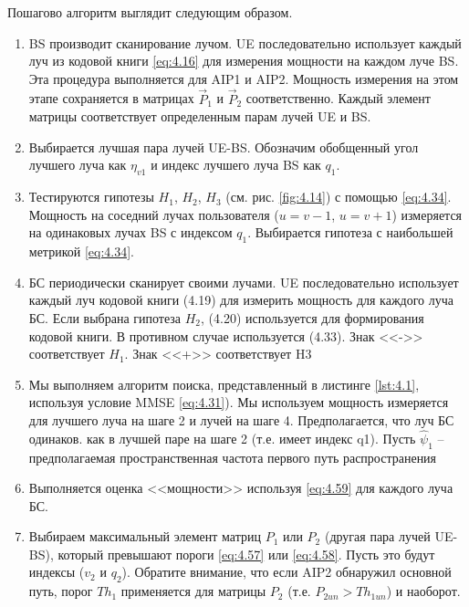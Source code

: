 Пошагово алгоритм выглядит следующим образом.
\begin{enumerate}[label=\textbf{Шаг \arabic*:}]
    \item BS производит сканирование лучом. UE последовательно использует
          каждый луч из кодовой книги \eqref{eq:4.16}
          для измерения мощности на каждом луче BS.  Эта процедура
          выполняется для AIP1 и AIP2. Мощность измерения на этом этапе
          сохраняется в матрицах $\vec P_1$ и $\vec P_2$ соответственно.
          Каждый элемент матрицы соответствует
          определенным парам лучей UE и BS.
    \item Выбирается лучшая пара лучей UE-BS. Обозначим обобщенный угол
          лучшего луча как $\eta_{v1}$ и индекс лучшего луча BS как
          $q_1$.
    \item Тестируются гипотезы $H_1$, $H_2$, $H_3$ (см. рис. \ref{fig:4.14}) с
          помощью \eqref{eq:4.34}. Мощность на соседний лучах пользователя
          ($u=v-1$, $u=v+1$) измеряется на одинаковых лучах BS с индексом
          $q_1$. Выбирается гипотеза с наибольшей метрикой \eqref{eq:4.34}.
    \item БС периодически сканирует своими лучами.
          UE последовательно использует каждый луч кодовой книги (4.19) для
          измерить мощность для каждого луча БС. Если выбрана гипотеза $H_2$,
          (4.20) используется для формирования кодовой книги.
          В противном случае используется (4.33).
          Знак <<->> соответствует $H_1$. Знак <<+>> соответствует H3
    \item Мы выполняем алгоритм поиска, представленный в листинге \ref{lst:4.1}, используя
          условие MMSE \eqref{eq:4.31}). 
          Мы используем мощность измеряется для лучшего луча на
          шаге 2 и лучей на шаге 4. Предполагается, что луч БС одинаков.  
          как в лучшей
          паре на шаге 2 (т.е. имеет индекс q1). Пусть $\hat \psi_1$ -- 
          предполагаемая пространственная частота первого путь распространения
    \item Выполняется оценка <<мощности>> используя \eqref{eq:4.59} для 
        каждого луча БС.
    \item Выбираем максимальный элемент матриц $P_1$ или $P_2$ (другая пара лучей
        UE-BS), который превышают пороги \eqref{eq:4.57} или \eqref{eq:4.58}. 
        Пусть это будут индексы
        ($v_2$ и $q_2$). 
        Обратите внимание, что если AIP2 обнаружил основной путь, порог
        $Th_1$ применяется для матрицы $P_2$ (т.е. $P_{2un} > Th_{1un}$) и наоборот. 

\end{enumerate}
